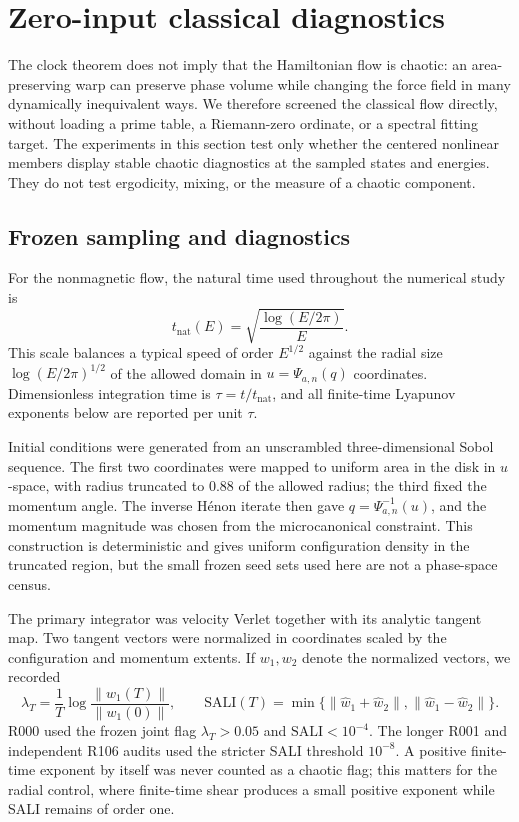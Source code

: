 \section{Zero-input classical diagnostics}
\label{sec:classical-dynamics}
\label{sec:classical}

The clock theorem does not imply that the Hamiltonian flow is chaotic: an
area-preserving warp can preserve phase volume while changing the force field
in many dynamically inequivalent ways.  We therefore screened the classical
flow directly, without loading a prime table, a Riemann-zero ordinate, or a
spectral fitting target.  The experiments in this section test only whether
the centered nonlinear members display stable chaotic diagnostics at the
sampled states and energies.  They do not test ergodicity, mixing, or the
measure of a chaotic component.

\subsection{Frozen sampling and diagnostics}

For the nonmagnetic flow, the natural time used throughout the numerical
study is
\begin{equation}
 t_{\mathrm{nat}}(E)
 =\sqrt{\frac{\log(E/2\pi)}{E}}.
 \label{eq:natural-time}
\end{equation}
This scale balances a typical speed of order \(E^{1/2}\) against the radial
size \(\log(E/2\pi)^{1/2}\) of the allowed domain in
\(u=\Psi_{a,n}(q)\) coordinates.  Dimensionless integration time is
\(\tau=t/t_{\mathrm{nat}}\), and all finite-time Lyapunov exponents below are
reported per unit \(\tau\).

Initial conditions were generated from an unscrambled three-dimensional
Sobol sequence.  The first two coordinates were mapped to uniform area in
the disk in \(u\)-space, with radius truncated to \(0.88\) of the allowed
radius; the third fixed the momentum angle.  The inverse H\'enon iterate then
gave \(q=\Psi_{a,n}^{-1}(u)\), and the momentum magnitude was chosen from the
microcanonical constraint.  This construction is deterministic and gives
uniform configuration density in the truncated region, but the small frozen
seed sets used here are not a phase-space census.

The primary integrator was velocity Verlet together with its analytic tangent
map.  Two tangent vectors were normalized in coordinates scaled by the
configuration and momentum extents.  If \(w_1,w_2\) denote the normalized
vectors, we recorded
\begin{equation}
 \lambda_T=\frac{1}{T}\log\frac{\|w_1(T)\|}{\|w_1(0)\|},
 \qquad
 \mathrm{SALI}(T)=
 \min\{\|\widehat w_1+\widehat w_2\|,
        \|\widehat w_1-\widehat w_2\|\}.
 \label{eq:ftle-sali}
\end{equation}
R000 used the frozen joint flag
\(\lambda_T>0.05\) and \(\mathrm{SALI}<10^{-4}\).  The longer R001 and
independent R106 audits used the stricter SALI threshold \(10^{-8}\).  A
positive finite-time exponent by itself was never counted as a chaotic flag;
this matters for the radial control, where finite-time shear produces a small
positive exponent while SALI remains of order one.

